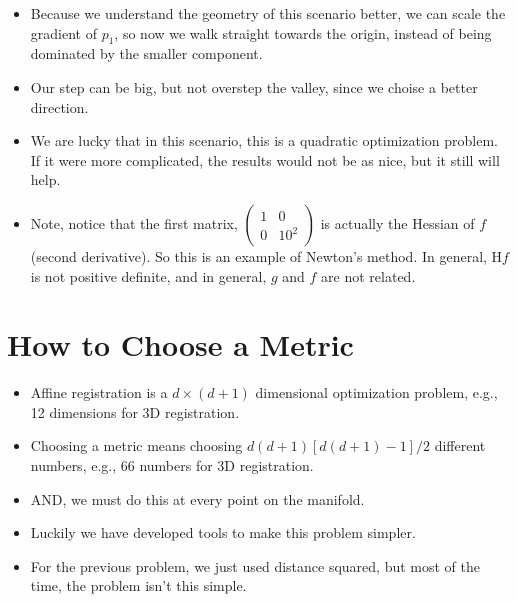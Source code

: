 \documentclass[10pt]{article}
\begin{document}
\begin{itemize}
	\item Because we understand the geometry of this scenario better, we can scale the gradient of $p_1$, so now we walk straight towards the origin, instead of being dominated by the smaller component.
	\item Our step can be big, but not overstep the valley, since we choise a better direction.
    \item We are lucky that in this scenario, this is a quadratic optimization problem.  If it were more complicated, the results would not be as nice, but it still will help.
    \item Note, notice that the first matrix, $\begin{pmatrix} 1 & 0 \\ 0 & 10^2 \end{pmatrix}$ is actually the Hessian of $f$ (second derivative).  So this is an example of Newton's method.  In general, H$f$ is not positive definite, and in general, $g$ and $f$ are not related.
\end{itemize}

\section*{How to Choose a Metric}
\begin{itemize}
	\item Affine registration is a $d \times (d + 1)$ dimensional optimization problem, e.g., 12 dimensions for 3D registration.
	\item Choosing a metric means choosing $d(d + 1)[d(d + 1) - 1] / 2$ different numbers, e.g., 66 numbers for 3D registration.
	\item AND, we must do this at every point on the manifold.
	\item Luckily we have developed tools to make this problem simpler.
	\item For the previous problem, we just used distance squared, but most of the time, the problem isn't this simple.
\end{itemize}
\end{document}
